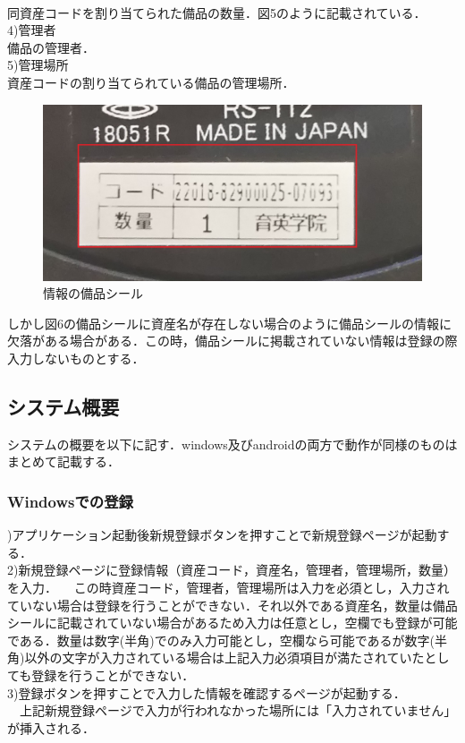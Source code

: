 \documentclass[11pt,a4j]{jarticle}
\begin{document}
\\同資産コードを割り当てられた備品の数量．図5のように記載されている．
\\4)管理者
\\備品の管理者．
\\5)管理場所
\\資産コードの割り当てられている備品の管理場所．
  \newpage
  \begin{figure}[h]
    \begin{center}
\includegraphics[keepaspectratio, scale=0.2]{jouhoutouroku2}
\caption{情報の備品シール}
\end{center}
\end{figure}

しかし図6の備品シールに資産名が存在しない場合のように備品シールの情報に欠落がある場合がある．この時，備品シールに掲載されていない情報は登録の際入力しないものとする．

  \subsection{システム概要}
  
システムの概要を以下に記す．windows及びandroidの両方で動作が同様のものはまとめて記載する．

\subsubsection{Windowsでの登録}
)アプリケーション起動後新規登録ボタンを押すことで新規登録ページが起動する．
\\2)新規登録ページに登録情報（資産コード，資産名，管理者，管理場所，数量）を入力．
　この時資産コード，管理者，管理場所は入力を必須とし，入力されていない場合は登録を行うことができない．それ以外である資産名，数量は備品シールに記載されていない場合があるため入力は任意とし，空欄でも登録が可能である．数量は数字(半角)でのみ入力可能とし，空欄なら可能であるが数字(半角)以外の文字が入力されている場合は上記入力必須項目が満たされていたとしても登録を行うことができない．
\\3)登録ボタンを押すことで入力した情報を確認するページが起動する．\\
　上記新規登録ページで入力が行われなかった場所には「入力されていません」が挿入される．
\end{document}
